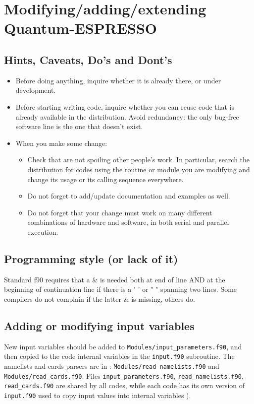 \documentclass[12pt,a4paper]{article}
\begin{document}
\section{Modifying/adding/extending Quantum-ESPRESSO}
\subsection{Hints, Caveats, Do's and Dont's}
\begin{itemize}
\item
Before doing anything, inquire whether it is already there,
or under development.
\item 
Before starting writing code, inquire whether you can reuse
code that is already available in the distribution. Avoid 
redundancy: the only bug-free software line is the one that 
doesn't exist.
\item When you make some change:
\begin{itemize}
\item Check that are not spoiling other people's work.
In particular, search the distribution for codes using the routine 
or module you are modifying and change its usage or its calling 
sequence everywhere.
\item Do not forget to add/update documentation and examples as well.
\item Do not forget that your change must work on many different 
combinations of hardware and software, in both serial and parallel
execution.
\end{itemize}
\end{itemize}
\subsection{Programming style (or lack of it)}

Standard f90 requires that a \& is needed both at end of line 
AND at the beginning of continuation line if there is a ' ' 
or " " spanning two lines. Some compilers do not complain
if the latter \& is missing, others do.

\subsection{Adding or modifying input variables}

New input variables should be added to \texttt{Modules/input\_parameters.f90}, 
and then copied to the code internal variables in the \texttt{input.f90}
subroutine. The namelists and cards parsers are in :
\texttt{Modules/read\_namelists.f90} and \texttt{Modules/read\_cards.f90}.
Files \texttt{input\_parameters.f90}, \texttt{read\_namelists.f90},
\texttt{read\_cards.f90} are shared by all codes, while each code 
has its own version of \texttt{input.f90}  used to copy input values 
into internal variables ).
\end{document}
